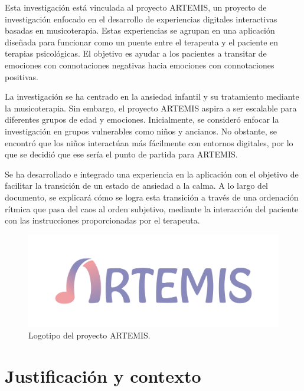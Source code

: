 Esta investigación está vinculada al proyecto ARTEMIS, un proyecto de investigación enfocado en el desarrollo de experiencias digitales interactivas basadas en musicoterapia. Estas experiencias se agrupan en una aplicación diseñada para funcionar como un puente entre el terapeuta y el paciente en terapias psicológicas. El objetivo es ayudar a los pacientes a transitar de emociones con connotaciones negativas hacia emociones con connotaciones positivas.

La investigación se ha centrado en la ansiedad infantil y su tratamiento mediante la musicoterapia. Sin embargo, el proyecto ARTEMIS aspira a ser escalable para diferentes grupos de edad y emociones. Inicialmente, se consideró enfocar la investigación en grupos vulnerables como niños y ancianos. No obstante, se encontró que los niños interactúan más fácilmente con entornos digitales, por lo que se decidió que ese sería el punto de partida para ARTEMIS.

Se ha desarrollado e integrado una experiencia en la aplicación con el objetivo de facilitar la transición de un estado de ansiedad a la calma. A lo largo del documento, se explicará cómo se logra esta transición a través de una ordenación rítmica que pasa del caos al orden subjetivo, mediante la interacción del paciente con las instrucciones proporcionadas por el terapeuta.

\begin{figure} [h!]
	\centering
	\includegraphics[width=0.9\linewidth]{Figuras/Introduccion/1_LogoArtemis}
	\caption{Logotipo del proyecto ARTEMIS.}
	\label{fig:logoArtemis}
\end{figure}

\section{Justificación y contexto}

